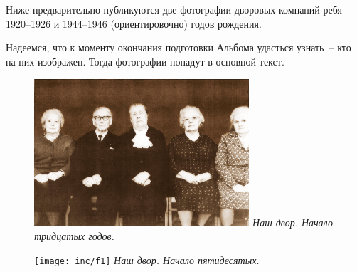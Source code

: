 \chapter{}

Ниже предварительно публикуются две фотографии дворовых компаний ребя 1920--1926 и 1944--1946 (ориентировочно) годов рождения.

Надеемся, что к моменту окончания подготовки Альбома удасться узнать~-- кто на них изображен. Тогда фотографии попадут в основной текст.

\vspace{10pt}

\begin{figure}[ht!]
    \begin{minipage}{80mm}
        \includegraphics[width=80mm]{inc/3/1}
        \footnotesize{\textit{Наш двор. Начало тридцатых годов.}}
     \end{minipage}
\end{figure}

\vspace{10pt}

\begin{figure}[h!]
\begin{minipage}{80mm}
    \texttt{[image: inc/f1]}
    \footnotesize{\textit{Наш двор. Начало пятидесятых.}}
\end{minipage}
\end{figure}

